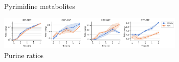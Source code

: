 \begin{figure}[!ht]
\begin{subfigure}[b]{0.68\textwidth}
        \caption{Pyrimidine metabolites}
        \label{fig:sapp:GOT_DKO_Asp_depl:HT1080_DKO_pyr}
    \end{subfigure}
    \hfill
    \begin{subfigure}[b]{0.9\textwidth}
        \includegraphics[width=\textwidth]{figures/sapp/GOT_DKO_Asp_depl/HT1080_DKO_pur.pdf}
        \caption{Purine ratios}
        \label{fig:sapp:GOT_DKO_Asp_depl:HT1080_DKO_pur}
    \end{subfigure}
    \hfill
    \caption{}
\end{figure}

